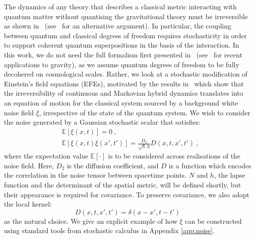 \documentclass[amsmath,amssymb,11pt]{article}
\begin{document}
The dynamics of any theory that describes a classical metric interacting with quantum matter without quantising the gravitational theory must be irreversible as shown in~\cite{oppenheim2021postquantum,oppenheim2023gravitationally} (see~\cite{galley2023consistent} for an alternative argument). In particular, the coupling between quantum and classical degrees of freedom requires stochasticity in order to support coherent quantum superpositions in the basis of the interaction. In this work, we do not need the full formalism first presented in~\cite{oppenheim2021postquantum,oppenheim2022classes} (see~\cite{layton2023weak,oppenheim2024diffeomorphism,grudka2024renormalisation,oppenheim2024anomalous,wellerdavies2024quantum} for recent applications to gravity), as we assume quantum degrees of freedom to be fully decohered on cosmological scales. Rather, we look at a stochastic modification of Einstein's field equations (EFEs), motivated by the results in~\cite{layton2023healthier} which show that the irreversibility of continuous and Markovian hybrid dynamics translates into an equation of motion for the classical system sourced by a background white noise field $\xi$, irrespective of the state of the quantum system. We wish to consider the noise generated by a Gaussian stochastic scalar that satisfies:
\begin{equation}
\begin{split}
\label{eq:stats}
    &\mathbb{E}[\xi(x,t)]=0 \ , \\ 
    &\mathbb{E}[\xi(x,t)\xi(x',t')]= \frac{D_2}{\sqrt{h} N} D(x,t,x',t') \ ,
\end{split}
\end{equation}
where the expectation value $\mathbb{E}[\cdot]$ is to be considered across realisations of the noise field. Here, $D_2$ is the diffusion coefficient, and $D$ is a function which encodes the correlation in the noise tensor between spacetime points. $N$ and $h$, the lapse function and the determinant of the spatial metric, will be defined shortly, but their appearance is required for covariance. To preserve covariance, we also adopt the local kernel:
\begin{equation}
    D(x,t,x',t')=\delta(x-x',t-t')
\end{equation}
as the natural choice. We give an explicit example of how $\xi$ can be constructed using standard tools from stochastic calculus in Appendix \ref{app:noise}.
\end{document}
